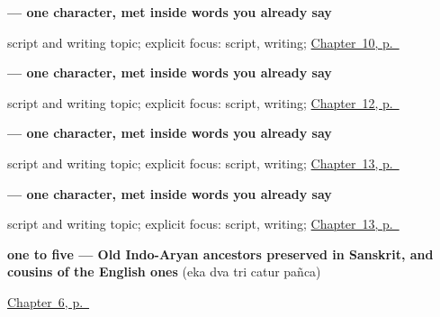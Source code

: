 \noindent\begin{minipage}[t]{\linewidth}
\raggedright
\textbf{ — one character, met inside words you already say}\par
\footnotesize script and writing topic; explicit focus: script, writing; \hyperref[ch:sa-request-nouns]{Chapter~10, p.~\pageref*{ch:sa-request-nouns}}
\end{minipage}\par\smallskip

\noindent\begin{minipage}[t]{\linewidth}
\raggedright
\textbf{ — one character, met inside words you already say}\par
\footnotesize script and writing topic; explicit focus: script, writing; \hyperref[ch:sa-face-nouns-1]{Chapter~12, p.~\pageref*{ch:sa-face-nouns-1}}
\end{minipage}\par\smallskip

\noindent\begin{minipage}[t]{\linewidth}
\raggedright
\textbf{ — one character, met inside words you already say}\par
\footnotesize script and writing topic; explicit focus: script, writing; \hyperref[ch:sa-face-nouns-2]{Chapter~13, p.~\pageref*{ch:sa-face-nouns-2}}
\end{minipage}\par\smallskip

\noindent\begin{minipage}[t]{\linewidth}
\raggedright
\textbf{ — one character, met inside words you already say}\par
\footnotesize script and writing topic; explicit focus: script, writing; \hyperref[ch:sa-face-nouns-2]{Chapter~13, p.~\pageref*{ch:sa-face-nouns-2}}
\end{minipage}\par\smallskip

\noindent\begin{minipage}[t]{\linewidth}
\raggedright
\textbf{one to five — Old Indo-Aryan ancestors preserved in Sanskrit, and cousins of the English ones}\enspace\emph{    }\enspace(eka dva tri catur pañca)\par
\footnotesize \hyperref[ch:numbers-one-to-five]{Chapter~6, p.~\pageref*{ch:numbers-one-to-five}}
\end{minipage}\par\smallskip

